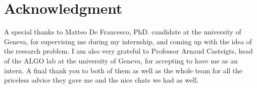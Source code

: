 \documentclass[journal,onecolumn]{IEEEtran}
\begin{document}
%


\appendices


\section*{Acknowledgment}
A special thanks to Matteo De Francesco, PhD. candidate at the university of Geneva, for supervising me during my internship, and coming up with the idea of the research problem. I am also very grateful to Professor Arnaud Casteigts, head of the ALGO lab at the university of Geneva, for accepting to have me as an intern. A final thank you to both of them as well as the whole team for all the priceless advice they gave me and the nice chats we had as well.

\ifCLASSOPTIONcaptionsoff
  \newpage
\fi







%
\end{document}
